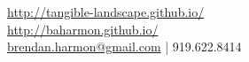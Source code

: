 \documentclass[]{baharmon_cv}
\begin{document}
%
%

%
%
{\vspace*{0.1cm} \url{http://tangible-landscape.github.io/} \\
\url{http://baharmon.github.io/}\\ 
\href{mailto:brendan.harmon@gmail.com}{brendan.harmon@gmail.com} | 919.622.8414 \\
}
%
%



%
%

\end{document}
